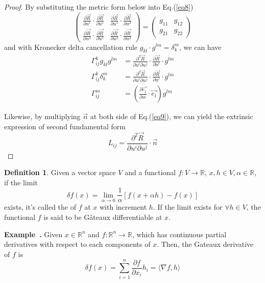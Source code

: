\documentclass[a4paper]{article}
\theoremstyle{definition}
\newtheorem{definition}{Definition}
\theoremstyle{plain}
\newenvironment{example}[1][]{\refstepcounter{example}\par\medskip
   \noindent \textbf{Example~\theexample. #1} \rmfamily}{\medskip}
\newcounter{example}{Example}
\begin{document}
\begin{proof}
By substituting the metric form below into Eq.(\ref{eq8})
\begin{equation*}
    \begin{pmatrix}
        \frac{\partial\vec{R}}{\partial u^1}\cdot\frac{\partial\vec{R}}{\partial u^1} & \frac{\partial\vec{R}}{\partial u^1}\cdot\frac{\partial\vec{R}}{\partial u^2} \\
        \frac{\partial\vec{R}}{\partial u^2}\cdot\frac{\partial\vec{R}}{\partial u^1} & \frac{\partial\vec{R}}{\partial u^2}\cdot\frac{\partial\vec{R}}{\partial u^2}
    \end{pmatrix}
    =
    \begin{pmatrix}
        g_{11} & g_{12} \\
        g_{21} & g_{22}
    \end{pmatrix}
\end{equation*}
and with Kronecker delta cancellation rule $g_{kl}\cdot g^{lm}=\delta_k^m$, we can have
\begin{align}
    \Gamma_{ij}^kg_{kl}g^{lm}&=\frac{\partial^2\vec{R}}{\partial u^i\partial u^j}\cdot\frac{\partial\vec{R}}{\partial u^l}\cdot g^{lm}\nonumber\\
    \Gamma_{ij}^k\delta_k^m&=\frac{\partial^2\vec{R}}{\partial u^i\partial u^j}\cdot\frac{\partial\vec{R}}{\partial u^l}\cdot g^{lm}\nonumber\\
    \Gamma_{ij}^m&=\left(\frac{\partial\Vec{e_j}}{\partial u^i}\cdot\Vec{e_l}\right)g^{lm}\label{chrisex}
\end{align}

Likewise, by multiplying $\vec{n}$ at both side of Eq.(\ref{eq9}), we can yield the extrinsic expression of second fundamental form
\begin{equation*}
    L_{ij}=\frac{\partial^2\vec{R}}{\partial u^i\partial u^j}\cdot \vec{n}
\end{equation*}
\end{proof}

\begin{definition}
Given a vector space $V$ and a functional $f:V\rightarrow\mathbb{R}$, $x,h\in V, \alpha\in\mathbb{R}$, if the limit
\begin{equation*}
    \delta f(x)=\lim_{\alpha\rightarrow0}\frac{1}{\alpha}[f(x+\alpha h)-f(x)]
\end{equation*}
exists, it's called the  of $f$ at $x$ with increment $h$. If the limit exists for $\forall h\in V$, the functional $f$ is said to be G\^ateaux differentiable at $x$.
\end{definition}
\begin{example}
Given $x\in\mathbb{R}^n$ and $f:\mathbb{R}^n\rightarrow\mathbb{R}$, which has continuous partial derivatives with respect to each components of $x$. Then, the Gateaux derivative of $f$ is
\begin{equation*}
    \delta f(x)=\sum^n_{i=1}\frac{\partial f}{\partial x_i}h_i=\langle\nabla f,h\rangle
\end{equation*}
\end{example}
\end{document}
